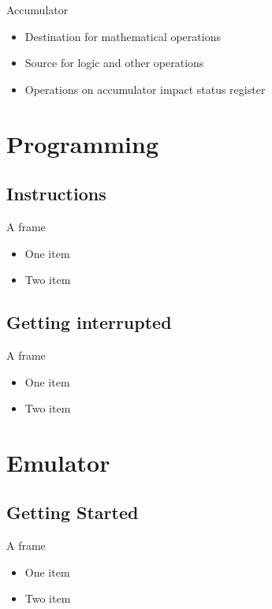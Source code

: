 \documentclass{beamer}
\begin{document}
\begin{frame}{Accumulator}
  \begin{itemize}
  \item
    Destination for mathematical operations
  \item
    Source for logic and other operations
  \item
    Operations on accumulator impact status register
  \end{itemize}
\end{frame}


\section{Programming}

\subsection[Instructions]{Instructions}

\begin{frame}{A frame}
  \begin{itemize}
  \item
    One item
  \item
    Two item
  \end{itemize}
\end{frame}


\subsection[Interupts]{Getting interrupted}

\begin{frame}{A frame}
  \begin{itemize}
  \item
    One item
  \item
    Two item
  \end{itemize}
\end{frame}


\section{Emulator}

\subsection[GettingStarted]{Getting Started}

\begin{frame}{A frame}
  \begin{itemize}
  \item
    One item
  \item
    Two item
  \end{itemize}
\end{frame}
\end{document}
